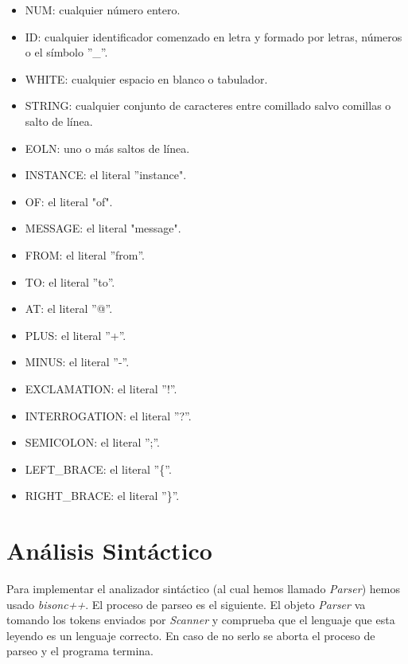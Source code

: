 \documentclass[12pt,a4paper]{report}
\begin{document}
\begin{itemize}
\item NUM: cualquier número entero.
\item ID: cualquier identificador comenzado en letra y formado por letras, números o el símbolo ''\_''.
\item WHITE: cualquier espacio en blanco o tabulador.
\item STRING: cualquier conjunto de caracteres entre comillado salvo comillas o salto de línea.
\item EOLN: uno o más saltos de línea.
\item INSTANCE: el literal ''instance".
\item OF: el literal "of".
\item MESSAGE: el literal "message".
\item FROM: el literal ''from''.
\item TO: el literal ''to''.
\item AT: el literal ''@''.
\item PLUS: el literal ''+''.
\item MINUS: el literal ''-''.
\item EXCLAMATION: el literal ''!''.
\item INTERROGATION: el literal ''?''.
\item SEMICOLON: el literal '';''.
\item LEFT\_BRACE: el literal ''\{''.
\item RIGHT\_BRACE: el literal ''\}''.
\end{itemize}

\section{Análisis Sintáctico}

Para implementar el analizador sintáctico (al cual hemos llamado \textit{Parser}) hemos usado \textit{bisonc++}. El proceso de parseo es el siguiente. El objeto \textit{Parser} va tomando los tokens enviados por \textit{Scanner} y comprueba que el lenguaje que esta leyendo es un lenguaje correcto. En caso de no serlo se aborta el proceso de parseo y el programa termina.
\end{document}
